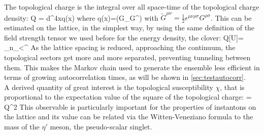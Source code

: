 The topological charge is the integral over all space-time of the topological charge density:
\beq
    Q = \int d^4xq(x)
\eeq
where
\beq 
    q(x)=\Tr(G_{\mu\nu}\tilde G^{\mu\nu}) 
\eeq 
with $\tilde G^{\mu\nu} = \frac{1}{2}\epsilon^{\mu\nu\rho\sigma} G^{\rho\sigma}$. This can be estimated on the lattice, in the simplest way, by using the same definition of the field strength tensor we used before for the energy density, the clover:
\beq
    Q[U]= \sum_{n\in\Lambda}\sum_{\mu<\nu}\epsilon^{\mu\nu\rho\sigma}
\eeq
As the lattice spacing is reduced, approaching the continuum, the topological sectors get more and more separated, preventing tunneling between them. This makes the Markov chain used to generate the ensemble less efficient in terms of growing autocorrelation times, as will be shown in \cref{sec:testautocorr}.\\
A derived quantity of great interest is the topological susceptibility $\chi$, that is proportional to the expectation value of the square of the topological charge:
\beq
    \chi = \langle Q^2 \rangle
\eeq
This observable is particularly important for the properties of instantons on the lattice and its value can be related via the Witten-Veneziano formula \cite{witten_current_1979} to the mass of the $\eta'$ meson, the pseudo-scalar singlet.

